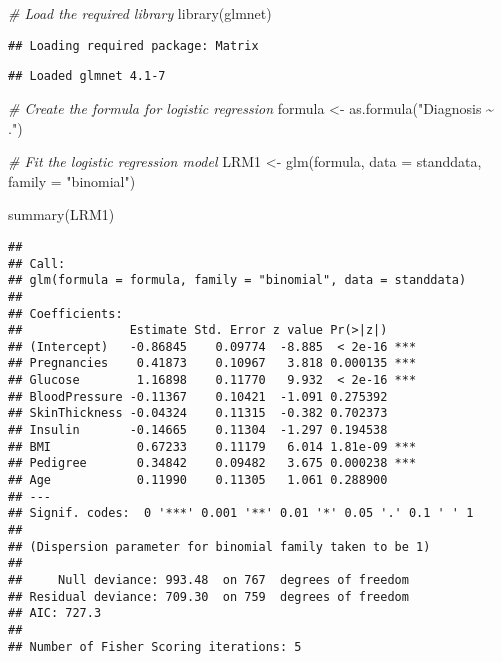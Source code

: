 \documentclass[
]{article}
\newenvironment{Shaded}{\begin{snugshade}}{\end{snugshade}}
\newcommand{\AttributeTok}[1]{\textcolor[rgb]{0.77,0.63,0.00}{#1}}
\newcommand{\CommentTok}[1]{\textcolor[rgb]{0.56,0.35,0.01}{\textit{#1}}}
\newcommand{\FunctionTok}[1]{\textcolor[rgb]{0.00,0.00,0.00}{#1}}
\newcommand{\NormalTok}[1]{#1}
\newcommand{\OtherTok}[1]{\textcolor[rgb]{0.56,0.35,0.01}{#1}}
\newcommand{\StringTok}[1]{\textcolor[rgb]{0.31,0.60,0.02}{#1}}
\begin{document}
\begin{Shaded}
\begin{Highlighting}[]
\CommentTok{\# Load the required library}
\FunctionTok{library}\NormalTok{(glmnet)}
\end{Highlighting}
\end{Shaded}

\begin{verbatim}
## Loading required package: Matrix
\end{verbatim}

\begin{verbatim}
## Loaded glmnet 4.1-7
\end{verbatim}

\begin{Shaded}
\begin{Highlighting}[]
\CommentTok{\# Create the formula for logistic regression}
\NormalTok{formula }\OtherTok{\textless{}{-}} \FunctionTok{as.formula}\NormalTok{(}\StringTok{"Diagnosis \textasciitilde{} ."}\NormalTok{)}

\CommentTok{\# Fit the logistic regression model}
\NormalTok{LRM1 }\OtherTok{\textless{}{-}} \FunctionTok{glm}\NormalTok{(formula, }\AttributeTok{data =}\NormalTok{ standdata, }\AttributeTok{family =} \StringTok{"binomial"}\NormalTok{)}

\FunctionTok{summary}\NormalTok{(LRM1)}
\end{Highlighting}
\end{Shaded}

\begin{verbatim}
## 
## Call:
## glm(formula = formula, family = "binomial", data = standdata)
## 
## Coefficients:
##               Estimate Std. Error z value Pr(>|z|)    
## (Intercept)   -0.86845    0.09774  -8.885  < 2e-16 ***
## Pregnancies    0.41873    0.10967   3.818 0.000135 ***
## Glucose        1.16898    0.11770   9.932  < 2e-16 ***
## BloodPressure -0.11367    0.10421  -1.091 0.275392    
## SkinThickness -0.04324    0.11315  -0.382 0.702373    
## Insulin       -0.14665    0.11304  -1.297 0.194538    
## BMI            0.67233    0.11179   6.014 1.81e-09 ***
## Pedigree       0.34842    0.09482   3.675 0.000238 ***
## Age            0.11990    0.11305   1.061 0.288900    
## ---
## Signif. codes:  0 '***' 0.001 '**' 0.01 '*' 0.05 '.' 0.1 ' ' 1
## 
## (Dispersion parameter for binomial family taken to be 1)
## 
##     Null deviance: 993.48  on 767  degrees of freedom
## Residual deviance: 709.30  on 759  degrees of freedom
## AIC: 727.3
## 
## Number of Fisher Scoring iterations: 5
\end{verbatim}
\end{document}
